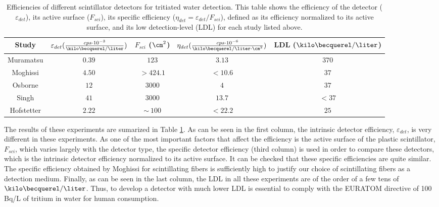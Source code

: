 \begin{table}[htbp]
\begin{center}
\begin{tabular}{|c|c|c|c|c|}
\hline
Study & \parbox{5.5em}{\centering $\varepsilon_{det}(\frac{cps \cdot{} 10^{-3}}{\kilo\becquerel/\liter})$}  & \parbox{4.5em}{\centering $F_{sci}$ ($\cm^2$)}  & \parbox{6.5em}{\centering $\eta_{det}(\frac{cps \cdot{} 10^{-6}}{\kilo\becquerel/ \liter \cdot{} \cm^2})$} & LDL ($\kilo\becquerel / \liter$)\\
\hline \hline \hline
Muramatsu & $0.39$ & $123$ & $3.13$ & $370$ \\ \hline
Moghissi & $4.50$ & $>424.1$ & $<10.6$ & $37$ \\\hline
Osborne & $12$ & $3000$ & $4$ & $37$ \\ \hline
Singh & $41$ & $3000$ & $13.7$ & $<37$ \\ \hline
Hofstetter & $2.22$ & $\sim~100$ & $<22.2$ & $25$ \\ \hline
\end{tabular}
\caption{Efficiencies of different scintillator detectors for tritiated water detection. This table shows the efficiency of the detector ($\varepsilon_{det}$), its active surface ($F_{sci}$), its specific efficiency ($\eta_{det}=\varepsilon_{det}/F_{sci}$), defined as its efficiency normalized to its active surface, and its low detection-level (LDL) for each study listed above.}
\label{tab:PlasticScinTritium}
\end{center}
\end{table}


The results of these experiments are sumarized in Table \ref{tab:PlasticScinTritium}. As can be seen in the first column, the intrinsic detector efficiency, $\varepsilon_{det}$, is very different in these experiments. As one of the most important factors that affect the efficiency is the active surface of the plastic scintillator, $F_{sci}$, which varies largely with the detector type, the specific detector efficiency (third column) is used in order to compare these detectors, which is the intrinsic detector efficiency normalized to its active surface. It can be checked that these specific efficiencies are quite similar. The specific efficiency obtained by Moghissi for scintillating fibers is sufficiently high to justify our choice of scintillating fibers as a detection medium. Finally, as can be seen in the last column, the LDL in all these experiments are of the order of a few tens of $\kilo\becquerel/\liter$. Thus, to develop a detector with much lower LDL is essential to comply with the EURATOM directive of 100 Bq/L of tritium in water for human consumption.